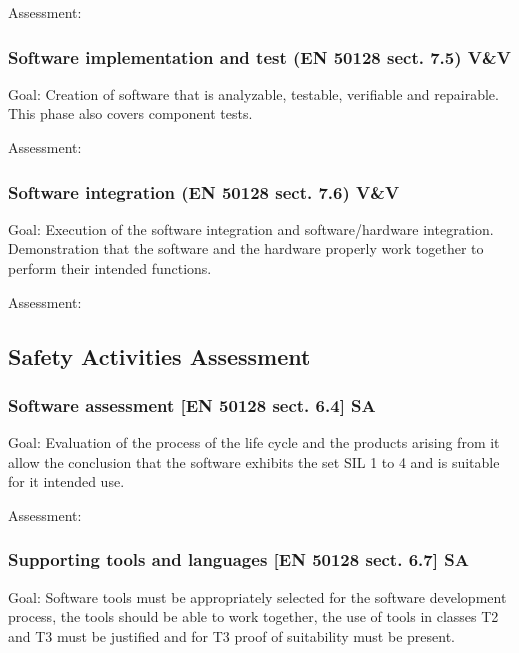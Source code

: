 Assessment:


\bigskip

\subsubsection{Software implementation and test
(EN 50128 sect. 7.5) V\&V}
Goal: Creation of software that is analyzable, testable, verifiable and repairable. This phase also covers component
tests.


\bigskip


\bigskip

Assessment:


\bigskip


\bigskip

\subsubsection{Software integration (EN 50128 sect. 7.6) V\&V}
Goal: Execution of the software integration and software/hardware integration. Demonstration that the software and the
hardware properly work together to perform their intended functions.


\bigskip


\bigskip

Assessment:


\bigskip

\subsection{Safety Activities Assessment}

\bigskip

\subsubsection{Software assessment [EN 50128 sect. 6.4] SA}
Goal: Evaluation of the process of the life cycle and the products arising from it allow the conclusion that the
software exhibits the set SIL 1 to 4 and is suitable for it intended use.


\bigskip

Assessment:


\bigskip

\subsubsection{Supporting tools and languages [EN 50128 sect. 6.7] SA}
Goal: Software tools must be appropriately selected for the software development process, the tools should be able to
work together, the use of tools in classes T2 and T3 must be justified and for T3 proof of suitability must be present.


